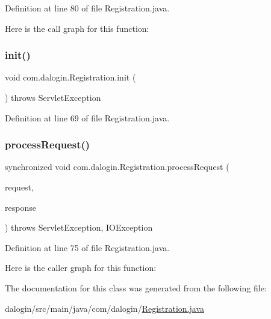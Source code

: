 Definition at line 80 of file Registration.\+java.

Here is the call graph for this function\+:
\mbox{\label{classcom_1_1dalogin_1_1_registration_a683507400fa150d8e73af073b2659498}} 
\subsubsection{\texorpdfstring{init()}{init()}}
{\footnotesize\ttfamily void com.\+dalogin.\+Registration.\+init (\begin{DoxyParamCaption}{ }\end{DoxyParamCaption}) throws Servlet\+Exception}



Definition at line 69 of file Registration.\+java.

\mbox{\label{classcom_1_1dalogin_1_1_registration_a769270d44c89eac47ace2b545f1dd283}} 
\subsubsection{\texorpdfstring{process\+Request()}{processRequest()}}
{\footnotesize\ttfamily synchronized void com.\+dalogin.\+Registration.\+process\+Request (\begin{DoxyParamCaption}\item[{Http\+Servlet\+Request}]{request,  }\item[{Http\+Servlet\+Response}]{response }\end{DoxyParamCaption}) throws Servlet\+Exception, I\+O\+Exception}



Definition at line 75 of file Registration.\+java.

Here is the caller graph for this function\+:


The documentation for this class was generated from the following file\+:\begin{DoxyCompactItemize}
\item 
dalogin/src/main/java/com/dalogin/\hyperlink{_registration_8java}{Registration.\+java}\end{DoxyCompactItemize}
